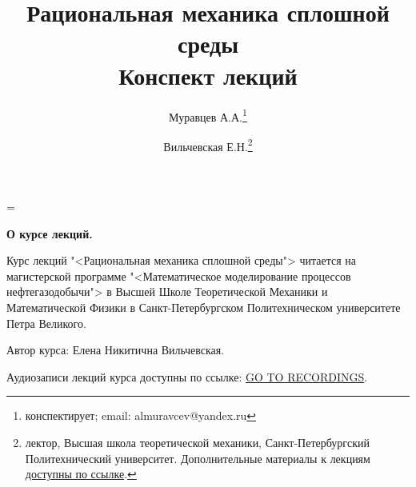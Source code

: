 \documentclass[a4paper,12pt]{article}
\newenvironment{nohyphen}
  {\tolerance=1
   \emergencystretch=\maxdimen
   \hyphenpenalty=10000
   \hbadness=10000}
  {\par}
\begin{document}
	
	\begin{nohyphen}
	
	\textbf{О курсе лекций.}
	
	Курс лекций "<Рациональная механика сплошной среды"> читается на магистерской программе "<Математическое моделирование процессов нефтегазодобычи"> в Высшей Школе Теоретической Механики и Математической Физики в Санкт-Петербургском Политехническом университете Петра Великого.
	
	Автор курса: Елена Никитична Вильчевская.
	
	Аудиозаписи лекций курса доступны по ссылке: \href{https://csspbstu-my.sharepoint.com/:f:/g/personal/muravtsev_aa_edu_spbstu_ru/Epiacj6WFMBHqIF6E3YQgCMB7yi5NAA1ycqFLqrTZMhJ4w?e=i2agP0}{GO TO RECORDINGS}.
	\end{nohyphen}
	
	\tableofcontents
	\title{Рациональная механика сплошной среды\\Конспект лекций}
	\author{Муравцев А.А.\thanks{конспектирует; email: almuravcev@yandex.ru}
	\and
	Вильчевская Е.Н.\thanks{лектор, Высшая школа теоретической механики, Санкт-Петербургский Политехнический университет. Дополнительные материалы к лекциям \href{https://csspbstu-my.sharepoint.com/:f:/g/personal/muravtsev_aa_edu_spbstu_ru/Epiacj6WFMBHqIF6E3YQgCMB7yi5NAA1ycqFLqrTZMhJ4w?e=i2agP0}{доступны по ссылке}.}}
	\maketitle
	\pagestyle{fancy}
	
	\newpage
	
	\newpage
	
	\newpage
	
	\newpage
	
	\newpage
	
	\newpage
	
	\newpage
	
	\newpage
	
	\newpage
	
	\newpage
	
	\newpage
	
	\newpage
	
	\newpage
\end{document}
